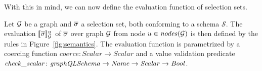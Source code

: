 With this in mind, we can now define the evaluation function of
selection sets.




\begin{definition}
  Let $\mathcal{G}$ be a graph and $\overline{\sigma}$ a selection set, both conforming
  to a schema $\mathcal{S}$. The evaluation $\llbracket \overline{\sigma}
  \rrbracket^{u}_{\mathcal{G}}$ of $\overline{\sigma}$ over graph $\mathcal{G}$
  from node $u \in \mathit{nodes}(\mathcal{G})$ %
  is then defined by the rules in Figure~\ref{fig:semantics}. The
  evaluation function 
  is parametrized by a coercing function
  $\mathit{coerce} \colon  \mathit{Scalar} \to \mathit{Scalar}$ and a value
  validation predicate
  $\mathit{check\_scalar} \colon \mathit{graphQLSchema} \to \mathit{Name} \to
  \mathit{Scalar} \to \mathit{Bool}$.
\end{definition}

